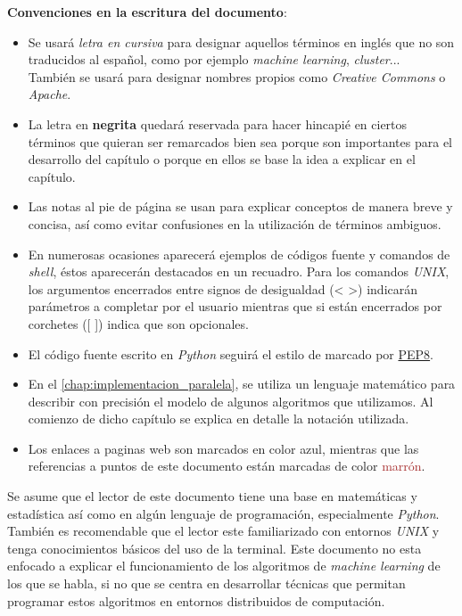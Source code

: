 \noindent \textbf{Convenciones en la escritura del documento}:
\begin{itemize}
  \item Se usará \textit{letra en cursiva} para designar aquellos términos en inglés que no son 
        traducidos al español, como por ejemplo \textit{machine learning}, \textit{cluster}...\\
        También se usará para designar nombres propios como \textit{Creative Commons} o \textit{Apache}.
  \item La letra en \textbf{negrita} quedará reservada para hacer hincapié en ciertos términos que 
        quieran ser remarcados bien sea porque son importantes para el desarrollo del capítulo 
        o porque en ellos se base la idea a explicar en el capítulo.
  \item Las notas al pie de página se usan para explicar conceptos de manera breve y concisa, 
        así como evitar confusiones en la utilización de términos ambiguos.
  \item En numerosas ocasiones aparecerá ejemplos de códigos fuente y comandos de \textit{shell}, 
        éstos aparecerán destacados en un recuadro. Para los comandos \textit{UNIX}, los argumentos encerrados 
        entre signos de desigualdad (< >) indicarán parámetros a completar por el usuario mientras que 
        si están encerrados por corchetes ([ ]) indica que son opcionales.
  \item El código fuente escrito en \textit{Python} seguirá el estilo de marcado por 
        \href{https://www.python.org/dev/peps/pep-0008/}{PEP8}.
  \item En el \autoref{chap:implementacion_paralela}, se utiliza un lenguaje matemático para describir 
        con precisión el modelo de algunos algoritmos que utilizamos. Al comienzo de dicho capítulo 
        se explica en detalle la notación utilizada.
  \item Los enlaces a paginas web son marcados en color \textcolor{blue!80!black}{azul}, mientras que 
        las referencias a puntos de este documento están marcadas de color %
        \textcolor{Brown}{marrón}.
\end{itemize}

\vspace*{0.5cm}

\noindent Se asume que el lector de este documento tiene una base en matemáticas y estadística así como en algún 
lenguaje de programación, especialmente \textit{Python}. También es recomendable que el lector este
familiarizado con entornos \textit{UNIX} y tenga conocimientos básicos del uso de la terminal.
Este documento no esta enfocado a explicar el funcionamiento de los algoritmos de \textit{machine learning} 
de los que se habla, si no que se centra en desarrollar técnicas que permitan programar estos algoritmos en 
entornos distribuidos de computación.
\newline

